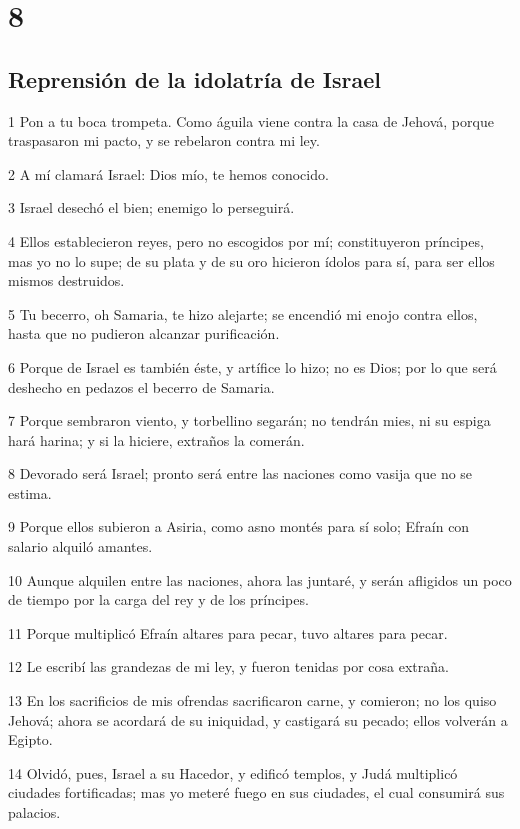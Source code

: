 \chapter{8}

\section*{Reprensión de la idolatría de Israel}

\par 1 Pon a tu boca trompeta. Como águila viene contra la casa de Jehová, porque traspasaron mi pacto, y se rebelaron contra mi ley.
\par 2 A mí clamará Israel: Dios mío, te hemos conocido.
\par 3 Israel desechó el bien; enemigo lo perseguirá.
\par 4 Ellos establecieron reyes, pero no escogidos por mí; constituyeron príncipes, mas yo no lo supe; de su plata y de su oro hicieron ídolos para sí, para ser ellos mismos destruidos.
\par 5 Tu becerro, oh Samaria, te hizo alejarte; se encendió mi enojo contra ellos, hasta que no pudieron alcanzar purificación.
\par 6 Porque de Israel es también éste, y artífice lo hizo; no es Dios; por lo que será deshecho en pedazos el becerro de Samaria.
\par 7 Porque sembraron viento, y torbellino segarán; no tendrán mies, ni su espiga hará harina; y si la hiciere, extraños la comerán.
\par 8 Devorado será Israel; pronto será entre las naciones como vasija que no se estima.
\par 9 Porque ellos subieron a Asiria, como asno montés para sí solo; Efraín con salario alquiló amantes.
\par 10 Aunque alquilen entre las naciones, ahora las juntaré, y serán afligidos un poco de tiempo por la carga del rey y de los príncipes.
\par 11 Porque multiplicó Efraín altares para pecar, tuvo altares para pecar.
\par 12 Le escribí las grandezas de mi ley, y fueron tenidas por cosa extraña.
\par 13 En los sacrificios de mis ofrendas sacrificaron carne, y comieron; no los quiso Jehová; ahora se acordará de su iniquidad, y castigará su pecado; ellos volverán a Egipto.
\par 14 Olvidó, pues, Israel a su Hacedor, y edificó templos, y Judá multiplicó ciudades fortificadas; mas yo meteré fuego en sus ciudades, el cual consumirá sus palacios.

